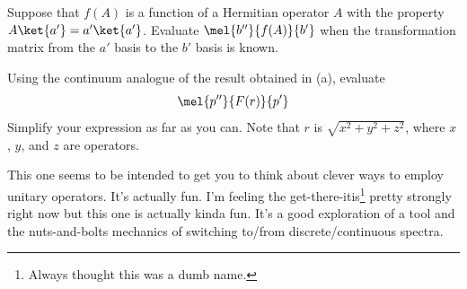 \begin{question}

  \begin{questionpart}
    Suppose that $f(A)$ is a function of a Hermitian operator $A$ with
    the property $A\ket{a'} = a'\ket{a'}$.  Evaluate
    $\mel{b''}{f(A)}{b'}$ when the transformation matrix from the $a'$
    basis to the $b'$ basis is known.
  \end{questionpart}

  \begin{questionpart}
    Using the continuum analogue of the result obtained in (a),
    evaluate
    \begin{equation*}
      \mel{p''}{F(r)}{p'}
    \end{equation*}
    Simplify your expression as far as you can.  Note that $r$ is
    $\sqrt{x^2 + y^2 + z^2}$, where $x$, $y$, and $z$ are operators.
  \end{questionpart}
\end{question}

\begin{purpose}
  This one seems to be intended to get you to think about clever ways
  to employ unitary operators.  It's actually fun.  I'm feeling the
  get-there-itis\footnote{Always thought this was a dumb name.} pretty
  strongly right now but this one is actually kinda fun.  It's a good
  exploration of a tool and the nuts-and-bolts mechanics of switching
  to/from discrete/continuous spectra.
\end{purpose}

